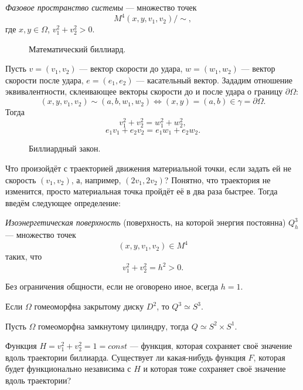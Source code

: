 \begin{definition}
    \textit{Фазовое пространство системы} — множество точек 
    $$M^4(x,y,v_1,v_2) / \sim,$$
    где $x,y \in \Omega$, $v_1^2+v_2^2 > 0.$
\end{definition} 

\begin{figure}[ht]
    \centering
    \caption{Математический биллиард.}
    \label{fig:c15.1}
\end{figure}


Пусть $v = (v_1,v_2)$ — вектор скорости до удара, $w = (w_1,w_2)$ — вектор скорости после удара, $e = (e_1,e_2)$ — касательный вектор. Зададим отношение эквивалентности, склеивающее векторы скорости до и после удара о границу $\partial \Omega$:
\[(x,y,v_1,v_2) \sim (a,b,w_1,w_2) \Longleftrightarrow (x,y) = (a,b) \in \gamma = \partial \Omega.\]
Тогда
\[v_1^2 + v_2^2 = w_1^2 + w_2^2,\]
\[e_1v_1 + e_2v_2 = e_1w_1 + e_2w_2.\]
\begin{figure}[ht]
    \centering
    \caption{Биллиардный закон.}
    \label{fig:c15.2}
\end{figure}

Что произойдёт с траекторией движения материальной точки, если задать ей не скорость $(v_1,v_2)$, а, например, $(2v_1, 2v_2)$? Понятно, что траектория не изменится, просто материальная точка пройдёт её в два раза быстрее. Тогда введём следующее определение:

\begin{definition}
    \textit{Изоэнергетическая поверхность} (поверхность, на которой энергия постоянна) $Q_h^3$ — множество точек 
    \[(x,y,v_1,v_2) \in M^4\]
    таких, что 
    \[v_1^2+v_2^2 = h^2 > 0.\]
\end{definition} 

\begin{remark}
    Без ограничения общности, если не оговорено иное, всегда $h=1$.
\end{remark}

\begin{statement}
    Если $\Omega$ гомеоморфна закрытому диску $D^2$, то $Q^3 \simeq S^3$.
\end{statement} 

\begin{statement}
    Пусть $\Omega$ гомеоморфна замкнутому цилиндру, тогда $Q \simeq S^2 \times S^1$.
\end{statement} 

Функция $H = v_1^2 + v_2^2 = 1 = const$ — функция, которая сохраняет своё значение вдоль траектории биллиарда. Существует ли какая-нибудь функция $F$, которая будет функционально независима с $H$ и которая тоже сохраняет своё значение вдоль траектории?

